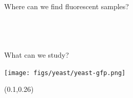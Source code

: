 \documentclass[presentation]{beamer}
\begin{document}
\begin{frame}{Where can we find fluorescent samples?}
\begin{columns}
\begin{column}{.33\textwidth}
      \\
    \end{column}
  \end{columns}
\end{frame}

\begin{frame}[label=sec-1]{What can we study?}
  \begin{center}
    \texttt{[image: figs/yeast/yeast-gfp.png]}
\end{center}
\setlength{\TPHorizModule}{\textwidth}
 \setlength{\TPVertModule}{\textwidth}
\begin{textblock}{0.5}(0.1,0.26)
 \end{textblock}
\end{frame}
\end{document}
